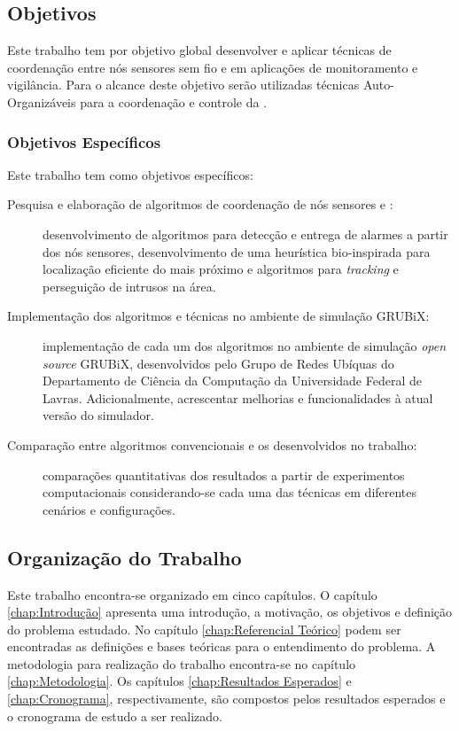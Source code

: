 \subsection{Objetivos}

Este trabalho tem por objetivo global desenvolver e aplicar técnicas de
coordenação entre nós sensores sem fio e \uavs em aplicações de monitoramento
e vigilância. Para o alcance deste objetivo serão utilizadas técnicas
Auto-Organizáveis para a coordenação e controle da \rssf.

\subsubsection{Objetivos Específicos}

Este trabalho tem como objetivos específicos:

\begin{description}

	\item [Pesquisa e elaboração de algoritmos de coordenação de nós
sensores e \vants:] desenvolvimento de algoritmos para detecção e entrega de
alarmes a partir dos nós sensores, desenvolvimento de uma heurística
bio-inspirada para localização eficiente do \uav mais próximo e algoritmos para
\emph{tracking} e perseguição de intrusos na área.

	\item [Implementação dos algoritmos e técnicas no ambiente de simulação
GRUBiX:] implementação de cada um dos algoritmos no ambiente de simulação
\emph{open source} GRUBiX, desenvolvidos pelo Grupo de Redes Ubíquas do
Departamento de Ciência da Computação da Universidade Federal de Lavras.
Adicionalmente, acrescentar melhorias e funcionalidades à atual versão do
simulador.

	\item [Comparação entre algoritmos convencionais e os desenvolvidos no
trabalho:] comparações quantitativas dos resultados a partir de experimentos
computacionais considerando-se cada uma das técnicas em diferentes cenários e
configurações.

\end{description}

%
\subsection{Organização do Trabalho}

Este trabalho encontra-se organizado em cinco capítulos. O capítulo
\ref{chap:Introdução} apresenta uma introdução, a motivação, os objetivos e
definição do problema estudado. No capítulo \ref{chap:Referencial Teórico} podem
ser encontradas as definições e bases teóricas para o entendimento do problema.
A metodologia para realização do trabalho encontra-se no capítulo
\ref{chap:Metodologia}. Os capítulos \ref{chap:Resultados Esperados} e
\ref{chap:Cronograma}, respectivamente, são compostos pelos resultados esperados
e o cronograma de estudo a ser realizado.


